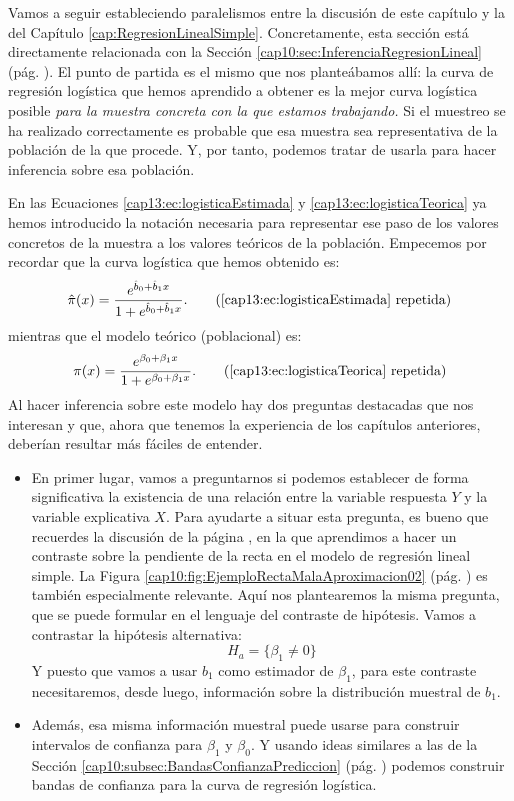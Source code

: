 Vamos a seguir estableciendo paralelismos entre la discusión de este capítulo y la del Capítulo \ref{cap:RegresionLinealSimple}. Concretamente, esta sección está directamente relacionada con la Sección \ref{cap10:sec:InferenciaRegresionLineal} (pág. \pageref{cap10:sec:InferenciaRegresionLineal}).  El punto de partida es el mismo que nos planteábamos allí: la curva de regresión logística que hemos aprendido a obtener es la mejor curva logística posible {\em para la muestra concreta con la que estamos trabajando.} Si el muestreo se ha realizado correctamente es  probable que esa muestra sea representativa de la población de la que procede. Y, por tanto, podemos tratar de usarla para hacer inferencia sobre esa población.

En las Ecuaciones \ref{cap13:ec:logisticaEstimada} y \ref{cap13:ec:logisticaTeorica} ya hemos introducido la notación  necesaria  para representar ese paso de los valores concretos de la muestra a los valores teóricos de la población. Empecemos por recordar que la curva logística que hemos obtenido es:
\begin{equation*}
\hat{\pi}(x)=\dfrac{e^{\hat b_0 + \hat b_1 x}}{1+e^{\hat b_0 + \hat b_1 x}}.
\tag{\ref{cap13:ec:logisticaEstimada} repetida}
\end{equation*}
mientras que el modelo teórico (poblacional) es:
\begin{equation*}
\pi(x)=\dfrac{e^{\beta_0+\beta_1 x}}{1+e^{\beta_0+\beta_1 x}}.
\tag{\ref{cap13:ec:logisticaTeorica} repetida}
\end{equation*}
Al hacer inferencia sobre este modelo hay dos preguntas destacadas que nos interesan y que,  ahora que tenemos la experiencia de los capítulos anteriores, deberían resultar más fáciles de entender.
\begin{itemize}
	\item En primer lugar, vamos a preguntarnos si podemos establecer de forma significativa la existencia de una relación entre la variable respuesta $Y$ y la variable explicativa $X$. Para ayudarte a situar esta pregunta, es bueno que recuerdes la discusión de la página \pageref{cap10:subsubsec:ContrasteHipotesisPendienteVariablesIncorreladas}, en la que aprendimos a hacer un  contraste sobre la pendiente de la recta en el modelo de regresión lineal simple. La Figura  \ref{cap10:fig:EjemploRectaMalaAproximacion02} (pág. \pageref{cap10:fig:EjemploRectaMalaAproximacion02}) es también especialmente relevante.  Aquí nos plantearemos la misma pregunta, que se puede formular en el lenguaje del contraste de hipótesis. Vamos a contrastar la hipótesis alternativa:
	\[  H_a=\{\beta_1\neq 0\}\]
	Y puesto que vamos a usar $b_1$ como estimador de $\beta_1$,  para este contraste necesitaremos, desde luego, información sobre la distribución muestral de $b_1$.

	
	\item Además, esa misma información muestral puede usarse para construir intervalos de confianza para $\beta_1$ y $\beta_0$. Y usando ideas similares a las de la Sección \ref{cap10:subsec:BandasConfianzaPrediccion} (pág. \pageref{cap10:subsec:BandasConfianzaPrediccion}) podemos construir bandas de confianza para la curva de regresión logística.
	
\end{itemize}
